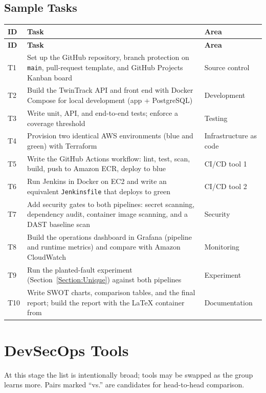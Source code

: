 \subsection{Sample Tasks}
\begin{tabularx}{\linewidth}{L{1.0cm}YL{3.0cm}}
\caption{Sample Project Tasks\label{Table:ProposalTasks}}\\
\toprule \textbf{ID} & \textbf{Task} & \textbf{Area}\\ \midrule
\endfirsthead
\toprule \textbf{ID} & \textbf{Task} & \textbf{Area}\\ \midrule
\endhead \bottomrule \endlastfoot
T1 & Set up the GitHub repository, branch protection on \texttt{main}, pull-request template, and GitHub Projects Kanban board & Source control\\
T2 & Build the TwinTrack API and front end with Docker Compose for local development (app + PostgreSQL) & Development\\
T3 & Write unit, API, and end-to-end tests; enforce a coverage threshold & Testing\\
T4 & Provision two identical AWS environments (blue and green) with Terraform & Infrastructure as code\\
T5 & Write the GitHub Actions workflow: lint, test, scan, build, push to Amazon ECR, deploy to blue & CI/CD tool 1\\
T6 & Run Jenkins in Docker on EC2 and write an equivalent \texttt{Jenkinsfile} that deploys to green & CI/CD tool 2\\
T7 & Add security gates to both pipelines: secret scanning, dependency audit, container image scanning, and a DAST baseline scan & Security\\
T8 & Build the operations dashboard in Grafana (pipeline and runtime metrics) and compare with Amazon CloudWatch & Monitoring\\
T9 & Run the planted-fault experiment (Section~\ref{Section:Unique}) against both pipelines & Experiment\\
T10 & Write SWOT charts, comparison tables, and the final report; build the report with the LaTeX container from  & Documentation\\
\end{tabularx}

\section{DevSecOps Tools}
At this stage the list is intentionally broad; tools may be swapped as the
group learns more. Pairs marked ``vs.'' are candidates for head-to-head
comparison.

